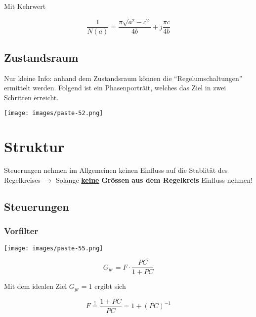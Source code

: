 \documentclass[
  10pt,
  a4paper,
  twocolumn]{article}
\numberwithin{equation}{section}
\begin{document}
Mit Kehrwert

\[
\frac1{N(a)}=\frac{\pi \sqrt{a^2-c^2}}{4b}+j\frac{\pi c}{4b}
\]

\subsection{Zustandsraum}\label{zustandsraum}

Nur kleine Info: anhand dem Zustandsraum können die
``Regelumschaltungen'' ermittelt werden. Folgend ist ein Phasenporträit,
welches das Ziel in zwei Schritten erreicht.

\texttt{[image: images/paste-52.png]}

\section{Struktur}\label{struktur}

\begin{tcolorbox}[enhanced jigsaw, coltitle=black, colback=white, breakable, colframe=quarto-callout-warning-color-frame, rightrule=.15mm, left=2mm, opacityback=0, leftrule=.75mm, toptitle=1mm, colbacktitle=quarto-callout-warning-color!10!white, bottomtitle=1mm, arc=.35mm, bottomrule=.15mm, title=\textcolor{quarto-callout-warning-color}{\faExclamationTriangle}\hspace{0.5em}{Steuerung \& Stabilität}, titlerule=0mm, toprule=.15mm, opacitybacktitle=0.6]

Steuerungen nehmen im Allgemeinen keinen Einfluss auf die Stablität des
Regelkreises \(\rightarrow\) Solange \ul{\textbf{keine}}
\textbf{Grössen} \textbf{aus dem Regelkreis} Einfluss nehmen!

\end{tcolorbox}

\subsection{Steuerungen}\label{steuerungen}

\subsubsection{Vorfilter}\label{vorfilter}

\texttt{[image: images/paste-55.png]}

\[
G_{yr}=F\cdot\frac{PC}{1+PC}
\]

Mit dem idealen Ziel \(G_{yr}=1\) ergibt sich

\[
F\stackrel{!}{=}\frac{1+PC}{PC}=1+(PC)^{-1}
\]
\end{document}
